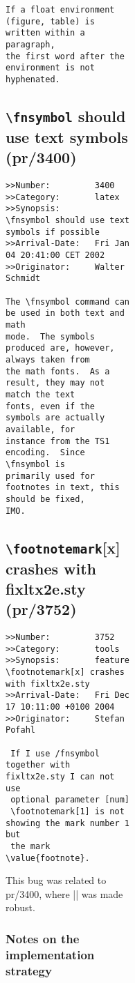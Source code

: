 \documentclass{ltxguide}
\begin{document}
\begin{figure}[tB]
\begin{figure}[t]
\begin{figure}[B]
\begin{figure}[]
\begin{verbatim}
If a float environment (figure, table) is written within a paragraph,
the first word after the environment is not hyphenated.
\end{verbatim}

\subsection{\texttt{\textbackslash fnsymbol} should use text symbols
    (pr/3400)}

\begin{verbatim}
>>Number:         3400
>>Category:       latex
>>Synopsis:       \fnsymbol should use text symbols if possible
>>Arrival-Date:   Fri Jan 04 20:41:00 CET 2002
>>Originator:     Walter Schmidt

The \fnsymbol command can be used in both text and math
mode.  The symbols produced are, however, always taken from
the math fonts.  As a result, they may not match the text
fonts, even if the symbols are actually available, for
instance from the TS1 encoding.  Since \fnsymbol is
primarily used for footnotes in text, this should be fixed,
IMO.
\end{verbatim}





\subsection{\texttt{\textbackslash footnotemark}[x] crashes with fixltx2e.sty
   (pr/3752)}

\begin{verbatim}
>>Number:         3752
>>Category:       tools
>>Synopsis:       feature \footnotemark[x] crashes with fixltx2e.sty
>>Arrival-Date:   Fri Dec 17 10:11:00 +0100 2004
>>Originator:     Stefan Pofahl

 If I use /fnsymbol together with fixltx2e.sty I can not use
 optional parameter [num]
 \footnotemark[1] is not showing the mark number 1 but
 the mark \value{footnote}.
\end{verbatim}
This bug was related to pr/3400, where |\@fnsymbol| was made robust.

\subsubsection{Notes on the implementation strategy}


\end{figure}
\end{figure}
\end{figure}
\end{figure}
\end{document}
